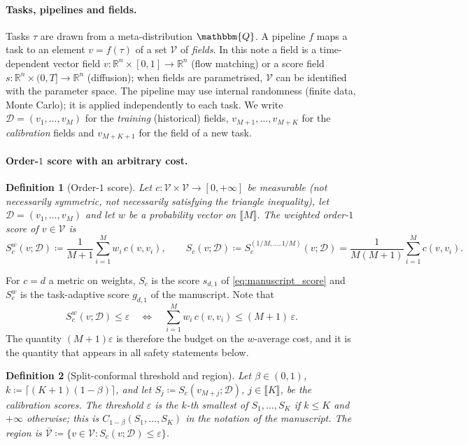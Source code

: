 \documentclass{article}
\newcommand{\RR}{\mathbb{R}}
\newcommand{\cV}{\mathcal{V}}                       %
\newcommand{\cD}{\mathcal{D}}                       %
\newcommand{\Sc}{S_c}                               %
\theoremstyle{plain}
\newtheorem{definition}{Definition}
\begin{document}
\paragraph{Tasks, pipelines and fields.}
Tasks $\tau$ are drawn from a meta-distribution $\mathbbm{Q}$. A pipeline $f$ maps a task to
an element $v=f(\tau)$ of a set $\cV$ of \emph{fields}. In this note a field is a
time-dependent vector field $v:\RR^n\times[0,1]\to\RR^n$ (flow matching) or a score field
$s:\RR^n\times(0,T]\to\RR^n$ (diffusion); when fields are parametrised, $\cV$ can be
identified with the parameter space. The pipeline may use internal randomness (finite data,
Monte Carlo); it is applied independently to each task. We write
$\cD=(v_1,\dots,v_M)$ for the \emph{training} (historical) fields,
$v_{M+1},\dots,v_{M+K}$ for the \emph{calibration} fields and $v_{M+K+1}$ for the field of a
new task.

\paragraph{Order-$1$ score with an arbitrary cost.}
\begin{definition}[Order-$1$ score]\label{def:score}
Let $c:\cV\times\cV\to[0,+\infty]$ be measurable (not necessarily symmetric, not necessarily
satisfying the triangle inequality), let $\cD=(v_1,\dots,v_M)$ and let $w$ be a probability
vector on $\llbracket M\rrbracket$. The weighted order-$1$ score of $v\in\cV$ is
\begin{equation}\label{eq:score}
  S^w_c(v;\cD)\coloneqq\frac{1}{M+1}\sum_{i=1}^M w_i\,c(v,v_i),
  \qquad
  S_c(v;\cD)\coloneqq S^{(1/M,\dots,1/M)}_c(v;\cD)=\frac{1}{M(M+1)}\sum_{i=1}^M c(v,v_i).
\end{equation}
\end{definition}
For $c=d$ a metric on weights, $S_c$ is the score $s_{d,1}$ of \eqref{eq:manuscript_score} and
$S^w_c$ is the task-adaptive score $g_{d,1}$ of the manuscript. Note that
\begin{equation}\label{eq:budget}
  S^w_c(v;\cD)\leq\varepsilon
  \quad\Longleftrightarrow\quad
  \sum_{i=1}^M w_i\,c(v,v_i)\leq(M+1)\,\varepsilon .
\end{equation}
The quantity $(M+1)\varepsilon$ is therefore the budget on the $w$-average cost, and it is
the quantity that appears in all safety statements below.

\begin{definition}[Split-conformal threshold and region]\label{def:region}
Let $\beta\in(0,1)$, $k\coloneqq\lceil(K+1)(1-\beta)\rceil$, and let $S_j\coloneqq\Sc(v_{M+j};\cD)$,
$j\in\llbracket K\rrbracket$, be the calibration scores. The threshold $\varepsilon$ is the
$k$-th smallest of $S_1,\dots,S_K$ if $k\leq K$ and $+\infty$ otherwise; this is
$C_{1-\beta}(S_1,\dots,S_K)$ in the notation of the manuscript. The region is
$\bar{\cV}\coloneqq\{v\in\cV:\Sc(v;\cD)\leq\varepsilon\}$.
\end{definition}
\end{document}
